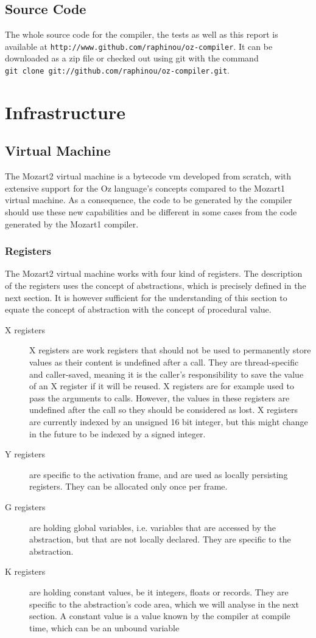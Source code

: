 \documentclass[a4paper]{memoir}
\begin{document}
\section{Source Code}
The whole source code for the compiler, the tests as well as this report is available
at \lstinline!http://www.github.com/raphinou/oz-compiler!. It can be downloaded
as a zip file or checked out using git with the command \\
\lstinline!git clone git://github.com/raphinou/oz-compiler.git!.
\chapter{Infrastructure}
\section{Virtual Machine}
The Mozart2 virtual machine is a bytecode vm developed from scratch, with extensive support for the Oz language's concepts compared to the Mozart1 virtual machine. As a consequence, the code to be generated by the compiler should use these new capabilities and be different in some cases from the code generated by the Mozart1 compiler.


\subsection{Registers}\label{sec:intro:registers}
The Mozart2 virtual machine works with four kind of registers. The description of the registers uses the concept of abstractions, which is precisely defined in the next section. It is however sufficient for the understanding of this section to equate the concept of abstraction with the concept of procedural value.
\begin{description}
  \item[X registers]X registers are work registers that should not be used to permanently
    store values as their content is undefined after a call. They are thread-specific and caller-saved, meaning it is the
    caller's responsibility to save the value of an X register if it will be
    reused.  X registers are for example used to pass the arguments to calls. However, the values in these registers are undefined after the call so they should be considered as lost. X registers are currently indexed by an unsigned 16 bit integer, but this might change in the future to be indexed by a signed integer.
  \item[Y registers]are specific to the activation frame, and are used as locally persisting registers. They can be allocated only once per frame.
  \item[G registers] are holding global variables, i.e. variables that are
    accessed by the abstraction, but that are not locally declared. They are
    specific to the abstraction.
  \item[K registers] are holding constant values, be it integers, floats or
    records. They are specific to the abstraction's code area, which we will analyse in the
    next section. A constant value is a value known by the compiler at compile time, which can be an unbound variable
\end{description}
\end{document}
